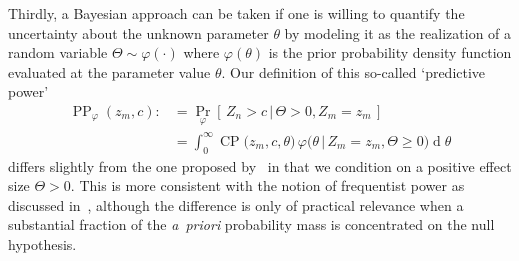 \documentclass{article}
\renewcommand{\Pr}{\operatorname{Pr}}
\newcommand{\CP}{\ensuremath{\operatorname{CP}}}
\newcommand{\PP}{\ensuremath{\operatorname{PP}}}
\renewcommand{\Pr}{\ensuremath{\operatorname{Pr}}}
\newcommand{\cond}{\ensuremath{\,|\,}}
\begin{document}
Thirdly, a Bayesian approach can be taken if one 
is willing to quantify the uncertainty about the unknown parameter $\theta$ by modeling it as the
realization of a random variable $\Theta\sim\varphi(\cdot)$ where $\varphi(\theta)$ is the
prior probability density function evaluated at the parameter value $\theta$.
Our definition of this so-called `predictive power'
\begin{align}
    \PP_\varphi(z_m,c) :&= \Pr_\varphi[\,Z_n > c \cond \Theta >0, Z_m = z_m\,] \\ 
    &= \int_{0}^{\infty}\CP\big(z_m, c, \theta\big)\,\varphi\big(\theta\cond Z_m=z_m, \Theta\geq0\big)\operatorname{d}\theta
\end{align}
differs slightly from the one proposed by~\citet{spiegelhalter1994}
in that we condition on a positive effect size $\Theta>0$. 
This is more consistent with the notion of frequentist power as discussed in~\cite{kunzmann2020}, although the difference is 
only of practical relevance when a substantial
fraction of the \textit{a~priori} probability mass is concentrated on the null hypothesis.
\end{document}
